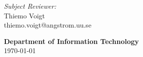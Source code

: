 \begin{titlepage}
    \vspace{.5in}
    \begin{minipage}{.97\textwidth}
        \begin{flushleft}
            \textit{Subject Reviewer:} \\
            Thiemo Voigt \\
            thiemo.voigt@angstrom.uu.se \\
        \end{flushleft}
    \end{minipage}
    
    \vspace{.5in}
    
    \textbf{\large Department of Information Technology} \\
    
    \today
    
    \end{titlepage}
    
    \newpage
    